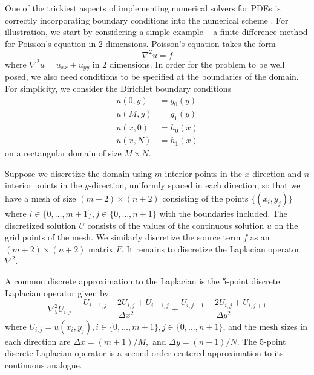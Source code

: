 \documentclass[conference]{IEEEtran}
\begin{document}
One of the trickiest aspects of implementing numerical solvers for PDEs is correctly incorporating boundary conditions into the numerical scheme . For illustration, we start by considering a simple example -- a finite difference method for Poisson's equation in 2 dimensions. Poisson's equation takes the form
\begin{equation}
  \nabla^2 u = f
\end{equation}
where $\nabla^2 u = u_{xx} + u_{yy}$ in 2 dimensions. In order for the problem to be well posed, we also need conditions to be specified at the boundaries of the domain. For simplicity, we consider the Dirichlet boundary conditions
\begin{align}
  u(0, y) &= g_0(y) \\
  u(M, y) &= g_1(y) \\
  u(x, 0) &= h_0(x) \\
  u(x, N) &= h_1(x)
\end{align}
on a rectangular domain of size $M \times N$.

Suppose we discretize the domain using $m$ interior points in the $x$-direction and $n$ interior points in the $y$-direction, uniformly spaced in each direction, so that we have a mesh of size $(m+2) \times (n+2)$ consisting of the points $\{(x_i, y_j)\}$ where $i \in \{0,\ldots,m+1\}, j \in \{0,\ldots,n+1\}$ with the boundaries included. The discretized solution $U$ consists of the values of the continuous solution $u$ on the grid points of the mesh. We similarly discretize the source term $f$ as an $(m+2) \times (n+2)$ matrix $F$. It remains to discretize the Laplacian operator $\nabla^2$.

A common discrete approximation to the Laplacian is the 5-point discrete Laplacian operator given by 
\begin{equation}
  \nabla_5^2 U_{i,j} = \frac{U_{i-1,j} - 2U_{i,j} + U_{i+1,j}}{\Delta x^2} + \frac{U_{i,j-1} - 2U_{i,j} + U_{i,j+1}}{\Delta y^2}
\end{equation}
where $U_{i,j} = u(x_i, y_j), i \in \{0,\ldots,m+1\}, j \in \{0,\ldots,n+1\}$, and the mesh sizes in each direction are $\Delta x = (m+1)/M,$ and $\Delta y = (n+1)/N$. The 5-point discrete Laplacian operator is a second-order centered approximation to its continuous analogue.
\end{document}
